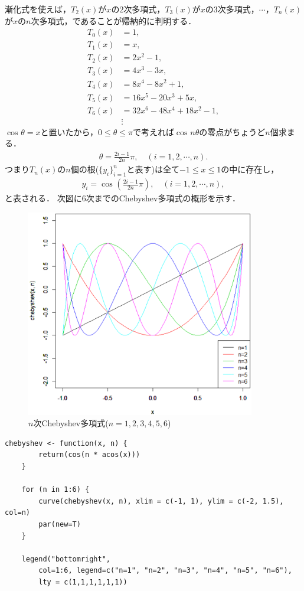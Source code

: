 \documentclass[a4j,papersize,disablejfam,slide,14pt]{jsarticle}
\def\cos#1#2{\operatorname{cos}^{#2} #1} %
\begin{document}
    漸化式を使えば，$T_2(x)$が$x$の$2$次多項式，$T_3(x)$が$x$の$3$次多項式，$\cdots$，$T_n(x)$が$x$の$n$次多項式，であることが帰納的に判明する．
    \begin{align}
    	T_0(x) &= 1, \\
        T_1(x) &= x, \\
        T_2(x) &= 2x^2 - 1, \\
        T_3(x) &= 4x^3 - 3x, \\
        T_4(x) &= 8x^4 - 8x^2 + 1, \\
        T_5(x) &= 16x^5 - 20x^3 + 5x, \\
        T_6(x) &= 32x^6 -48x^4 + 18x^2 -1, \\
        &\vdots
    \end{align}
    $\cos{\theta}{} = x$と置いたから，$0 \leq \theta \leq \pi$で考えれば$\cos{n\theta}{}$の零点がちょうど$n$個求まる．
    \begin{align}
    	\theta = \frac{2i-1}{2n}\pi, \quad (i=1,2,\cdots,n).
    \end{align}
    つまり$T_n(x)$の$n$個の根($\{y_i\}_{i=1}^{n}$と表す)は全て$-1 \leq x \leq 1$の中に存在し，
    \begin{align}
    	y_i = \cos{\left( \frac{2i-1}{2n}\pi \right)}{}, \quad (i=1,2,\cdots,n),
    \end{align}
    と表される．
    次図に$6$次までの{\rm Chebyshev}多項式の概形を示す．
    \begin{figure}[H]
        \begin{center}
    	\includegraphics[clip,width = 10.0cm]{graphics/chebyshev.eps}
        \end{center}
        \caption{$n$次{\rm Chebyshev}多項式($n=1,2,3,4,5,6$)}
    \end{figure}
    \begin{lstlisting}[style=customR]
	chebyshev <- function(x, n) {
    	return(cos(n * acos(x)))
	}
	
	for (n in 1:6) {
    	curve(chebyshev(x, n), xlim = c(-1, 1), ylim = c(-2, 1.5), col=n)
    	par(new=T)
	}
	
	legend("bottomright",
    	col=1:6, legend=c("n=1", "n=2", "n=3", "n=4", "n=5", "n=6"),
    	lty = c(1,1,1,1,1,1))
	\end{lstlisting}
    
\end{document}
